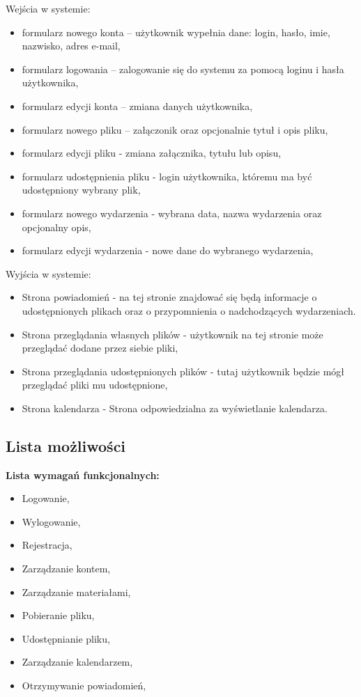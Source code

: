 Wejścia w systemie:
\begin{itemize}
	\item formularz nowego konta – użytkownik wypełnia dane: login, hasło, imie, nazwisko, adres e-mail,
	\item formularz logowania – zalogowanie się do systemu za pomocą loginu i hasła użytkownika,
	\item formularz edycji konta – zmiana danych użytkownika,
	\item formularz nowego pliku – załączonik oraz opcjonalnie tytuł i opis pliku,
	\item formularz edycji pliku - zmiana załącznika, tytułu lub opisu,
	\item formularz udostępnienia pliku - login użytkownika, któremu ma być udostępniony wybrany plik,
	\item formularz nowego wydarzenia - wybrana data, nazwa wydarzenia oraz opcjonalny opis,
	\item formularz edycji wydarzenia - nowe dane do wybranego wydarzenia,
\end{itemize}
Wyjścia w systemie:
\begin{itemize}
	\item Strona powiadomień - na tej stronie znajdować się będą informacje o udostępnionych plikach oraz o przypomnienia o nadchodzących wydarzeniach.
	\item Strona przeglądania własnych plików - użytkownik na tej stronie może przeglądać dodane przez siebie pliki,
	\item Strona przeglądania udostępnionych plików - tutaj użytkownik będzie mógł przeglądać pliki mu udostępnione,
	\item Strona kalendarza - Strona odpowiedzialna za wyświetlanie kalendarza.
\end{itemize}
\subsection{Lista możliwości}
\label{listaFun}
\textbf{Lista wymagań funkcjonalnych:}
\begin{itemize}
	\item Logowanie,
	\item Wylogowanie,
	\item Rejestracja,
	\item Zarządzanie kontem,
	\item Zarządzanie materiałami,
	\item Pobieranie pliku,
	\item Udostępnianie pliku,
	\item Zarządzanie kalendarzem,
	\item Otrzymywanie powiadomień,
\end{itemize}

